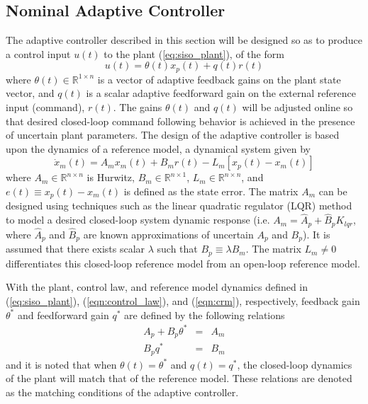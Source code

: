 \subsection{Nominal Adaptive Controller}
The adaptive controller described in this section will be designed so as to produce a control input $u(t)$ to the plant (\ref{eq:siso_plant}), of the form
\begin{equation}
	u(t) = \theta(t) x_p(t) + q(t) r(t)
	\label{eqn:control_law}
\end{equation}
\noindent where $\theta(t) \in \mathbb{R}^{1 \times n}$ is a vector of adaptive feedback gains on the plant state vector, and $q(t)$ is a scalar adaptive feedforward gain on the external reference input (command), $r(t)$. The gains $\theta(t)$ and $q(t)$ will be adjusted online so that desired closed-loop command following behavior is achieved in the presence of uncertain plant parameters. The design of the adaptive controller is based upon the dynamics of a reference model, a dynamical system given by
\begin{equation}
	\dot{x}_m(t) = A_m x_m(t) + B_m r(t) - L_m \left[x_p(t) - x_m(t)\right]
	\label{eqn:crm}
\end{equation}
\noindent where $A_m \in \mathbb{R}^{n \times n}$ is Hurwitz, $B_m \in \mathbb{R}^{n \times 1}$, $L_m \in \mathbb{R}^{n \times n}$, and $e(t) \equiv x_p(t) - x_m(t)$ is defined as the state error. The matrix $A_m$ can be designed using techniques such as the linear quadratic regulator (LQR) method to model a desired closed-loop system dynamic response (i.e. $A_m = \hat{A}_p + \hat{B}_p K_{lqr}$, where $\hat{A}_p$ and $\hat{B}_p$ are known approximations of uncertain $A_p$ and $B_p$). It is assumed that there exists scalar $\lambda$ such that $B_p \equiv \lambda B_m$. The matrix $L_m \neq 0$ differentiates this closed-loop reference model from an open-loop reference model. 

With the plant, control law, and reference model dynamics defined in (\ref{eq:siso_plant}), (\ref{eqn:control_law}), and (\ref{eqn:crm}), respectively, feedback gain $\theta^*$ and feedforward gain $q^*$ are defined by the following relations
\begin{eqnarray}
	A_p + B_p \theta^* &=& A_m \label{eqn:matchcond1} \\
	B_p q^* &=& B_m \label{eqn:matchcond2} 
\end{eqnarray}
and it is noted that when $\theta(t) = \theta^*$ and $q(t) = q^*$, the closed-loop dynamics of the plant will match that of the reference model. These relations are denoted as the matching conditions of the adaptive controller.


